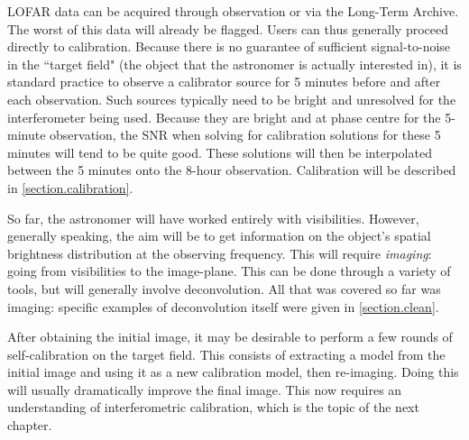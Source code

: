 \pg
LOFAR data can be acquired through observation or via the Long-Term Archive. The worst of this data will already be flagged. Users can thus generally proceed directly to calibration. Because there is no guarantee of sufficient signal-to-noise in the ``target field" (the object that the astronomer is actually interested in), it is standard practice to observe a calibrator source for 5 minutes before and after each observation. Such sources typically need to be bright and unresolved for the interferometer being used. Because they are bright and at phase centre for the 5-minute observation, the SNR when solving for calibration solutions for these 5 minutes will tend to be quite good. These solutions will then be interpolated between the 5 minutes onto the 8-hour observation. Calibration will be described in \cref{section.calibration}.

\pg
So far, the astronomer will have worked entirely with visibilities. However, generally speaking, the aim will be to get information on the object's spatial brightness distribution at the observing frequency. This will require \emph{imaging}: going from visibilities to the image-plane. This can be done through a variety of tools, but will generally involve deconvolution. All that was covered so far was imaging: specific examples of deconvolution itself were given in \cref{section.clean}.

\pg
After obtaining the initial image, it may be desirable to perform a few rounds of self-calibration  on the target field. This consists of extracting a model from the initial image and using it as a new calibration model, then re-imaging. Doing this will usually dramatically improve the final image. This now requires an understanding of interferometric calibration, which is the topic of the next chapter.

